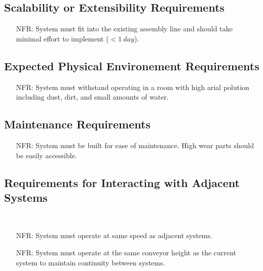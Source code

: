 \documentclass[12pt]{article}
\newcounter{nfrnum} %
\begin{document}
  \subsection{Scalability or Extensibility Requirements}
  \noindent \begin{itemize}
  \item[NFR\refstepcounter{nfrnum}\thenfrnum \label{NFR_Scalability1}:]
  System must fit into the existing assembly line and should take minimal effort to implement ($<1\ day$).
  \end{itemize}


  \subsection{Expected Physical Environement Requirements}
  \noindent \begin{itemize}
  \item[NFR\refstepcounter{nfrnum}\thenfrnum \label{NFR_Environment1}:]
  System must withstand operating in a room with high arial polution including dust, dirt, and small amounts of water.
  \end{itemize}
  \subsection{Maintenance Requirements}
  \noindent \begin{itemize}
  \item[NFR\refstepcounter{nfrnum}\thenfrnum \label{NFR_Maintenance1}:]
  System must be built for ease of maintenance. High wear parts should be easily accessible.
  \end{itemize}


  \subsection{Requirements for Interacting with Adjacent Systems }\
  \noindent \begin{itemize}
  \item[NFR\refstepcounter{nfrnum}\thenfrnum \label{NFR_Adjacent1}:]
  System must operate at same speed as adjacent systems.
  
  \item[NFR\refstepcounter{nfrnum}\thenfrnum \label{NFR_Adjacent2}:]
  System must operate at the same conveyor height as the current system to maintain continuity between systems.
  
  \end{itemize}
\end{document}
